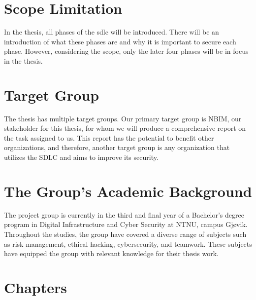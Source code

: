 \section{Scope Limitation}
In the thesis, all phases of the \acrlong{sdlc} will be introduced. There will be an introduction of what these phases are and why it is important to secure each phase. However, considering the scope, only the later four phases will be in focus in the thesis. 

\section{Target Group}
The thesis has multiple target groups. Our primary target group is NBIM, our stakeholder for this thesis, for whom we will produce a comprehensive report on the task assigned to us. This report has the potential to benefit other organizations, and therefore, another target group is any organization that utilizes the SDLC and aims to improve its security.

\section{The Group’s Academic Background}
The project group is currently in the third and final year of a Bachelor's degree program in Digital Infrastructure and Cyber Security at NTNU, campus Gjøvik. Throughout the studies, the group have covered a diverse range of subjects such as risk management, ethical hacking, cybersecurity, and teamwork. These subjects have equipped the group with relevant knowledge for their thesis work.
\section{Chapters}

